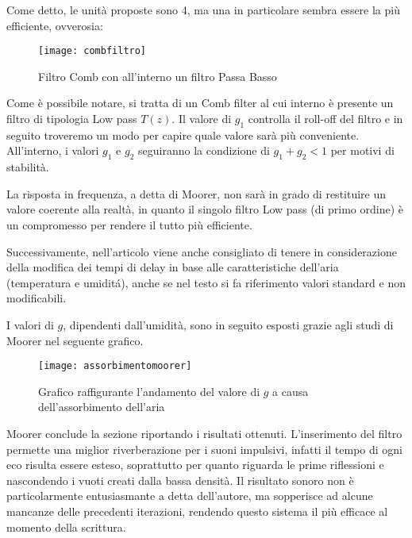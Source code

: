 Come detto, le unità proposte sono 4, ma una in particolare sembra essere la
più efficiente, ovverosia:

\begin{figure}[htp]
\centering
\texttt{[image: combfiltro]}
\caption{Filtro Comb con all'interno un filtro Passa Basso}
\label{fig:combfiltro}
\end{figure}

Come è possibile notare, si tratta di un Comb filter al cui interno è presente
un filtro di tipologia Low pass $T(z)$. Il valore di $g_1$ controlla il roll-off
del filtro e in seguito troveremo un modo per capire quale valore sarà più
conveniente. All’interno, i valori $g_1$ e $g_2$ seguiranno la condizione
di $g_1+g_2<1$ per motivi di stabilità.

La risposta in frequenza, a detta di Moorer,  non sarà in grado di restituire
un valore coerente alla realtà, in quanto il singolo filtro Low pass (di primo
ordine) è un compromesso per rendere il tutto più efficiente.

Successivamente, nell’articolo viene anche consigliato di tenere in
considerazione della modifica dei tempi di delay in base alle caratteristiche
dell’aria (temperatura e umiditá), anche se nel testo si fa riferimento
valori standard e non modificabili.

I valori di $g$, dipendenti dall’umidità, sono in seguito esposti grazie agli
studi di Moorer nel seguente grafico.

\begin{figure}[h!]
\centering
\texttt{[image: assorbimentomoorer]}
\caption{Grafico raffigurante l'andamento del valore di $g$ a causa dell'assorbimento dell'aria}
\label{fig:assorbimentomoorer}
\end{figure}



Moorer conclude la sezione riportando i risultati ottenuti. L’inserimento del
filtro permette una miglior riverberazione per i suoni impulsivi, infatti il
tempo di ogni eco risulta essere esteso, soprattutto per quanto riguarda le
prime riflessioni e nascondendo i vuoti creati dalla bassa densità.
Il risultato sonoro non è particolarmente entusiasmante a detta dell’autore,
ma sopperisce ad alcune mancanze delle precedenti iterazioni, rendendo questo
sistema il più efficace al momento della scrittura.
